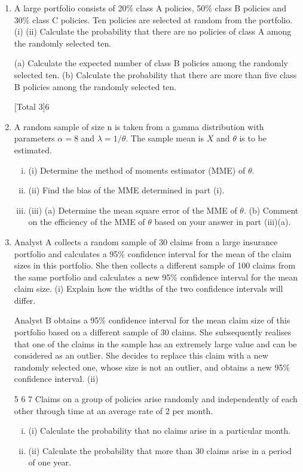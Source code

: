 \documentclass[a4paper,12pt]{article}
\begin{document}
\begin{enumerate}
\item 
A large portfolio consists of 20\% class A policies, 50\% class B policies and 30\% class
C policies. Ten policies are selected at random from the portfolio.
(i)
(ii)
Calculate the probability that there are no policies of class A among the
randomly selected ten.

(a) Calculate the expected number of class B policies among the randomly
selected ten.
(b) Calculate the probability that there are more than five class B policies
among the randomly selected ten.

[Total 3]6

\item 
A random sample of size n is taken from a gamma distribution with parameters $\alpha = 8$
and $\lambda = 1/\theta$. The sample mean is $X$ and $\theta$ is to be estimated.
\begin{enumerate}[(i)]
\item (i) Determine the method of moments estimator (MME) of $\theta$. 
\item (ii) Find the bias of the MME determined in part (i). 
\item (iii) (a) Determine the mean square error of the MME of $\theta$. (b) Comment on the efficiency of the MME of $\theta$ based on your answer in
part (iii)(a).
\end{enumerate}

\item Analyst A collects a random sample of 30 claims from a large insurance portfolio and
calculates a 95\% confidence interval for the mean of the claim sizes in this portfolio.
She then collects a different sample of 100 claims from the same portfolio and
calculates a new 95\% confidence interval for the mean claim size.
(i)
Explain how the widths of the two confidence intervals will differ.

Analyst B obtains a 95\% confidence interval for the mean claim size of this portfolio
based on a different sample of 30 claims. She subsequently realises that one of the
claims in the sample has an extremely large value and can be considered as an outlier.
She decides to replace this claim with a new randomly selected one, whose size is not
an outlier, and obtains a new 95\% confidence interval.
(ii)

5
6
7
Claims on a group of policies arise randomly and independently of each other through
time at an average rate of 2 per month.
\begin{enumerate}[(i)]
\item (i) Calculate the probability that no claims arise in a particular month.
\item 
(ii) Calculate the probability that more than 30 claims arise in a period of one
year.
\end{enumerate}


\end{enumerate}
\end{document}
